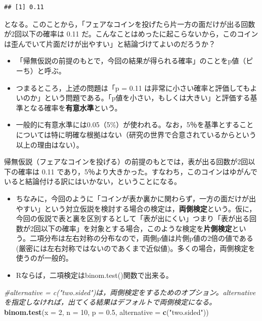 \documentclass[]{article}
\newenvironment{Shaded}{\begin{snugshade}}{\end{snugshade}}
\newcommand{\KeywordTok}[1]{\textcolor[rgb]{0.13,0.29,0.53}{\textbf{#1}}}
\newcommand{\DataTypeTok}[1]{\textcolor[rgb]{0.13,0.29,0.53}{#1}}
\newcommand{\DecValTok}[1]{\textcolor[rgb]{0.00,0.00,0.81}{#1}}
\newcommand{\FloatTok}[1]{\textcolor[rgb]{0.00,0.00,0.81}{#1}}
\newcommand{\StringTok}[1]{\textcolor[rgb]{0.31,0.60,0.02}{#1}}
\newcommand{\CommentTok}[1]{\textcolor[rgb]{0.56,0.35,0.01}{\textit{#1}}}
\newcommand{\NormalTok}[1]{#1}
\providecommand{\tightlist}{%
  \setlength{\itemsep}{0pt}\setlength{\parskip}{0pt}}
\begin{document}
\begin{verbatim}
## [1] 0.11
\end{verbatim}

となる。このことから，「フェアなコインを投げたら片一方の面だけが出る回数が2回以下の確率は
0.11
だ。こんなことはめったに起こらないから，このコインは歪んでいて片面だけが出やすい」と結論づけてよいのだろうか？

\begin{itemize}
\tightlist
\item
  「帰無仮説の前提のもとで，今回の結果が得られる確率」のことをp値（ピーち）と呼ぶ。
\item
  つまるところ，上述の問題は「p = 0.11
  は非常に小さい確率と評価してもよいのか」という問題である。「p値を小さい，もしくは大きい」と評価する基準となる確率を\textbf{有意水準}という。
\item
  一般的に有意水準には0.05（5\%）が使われる。なお，5％を基準とすることについては特に明確な根拠はない（研究の世界で合意されているからという以上の理由はない）。
\end{itemize}

帰無仮説（フェアなコインを投げる）の前提のもとでは，表が出る回数が2回以下の確率は
0.11
であり，5％より大きかった。すなわち，このコインはゆがんでいると結論付ける訳にはいかない，ということになる。

\begin{itemize}
\item
  ちなみに，今回のように「コインが表か裏かに関わらず，一方の面だけが出やすい」という対立仮説を検討する場合の検定は，\textbf{両側検定}という。仮に，今回の仮説で表と裏を区別するとして「表が出にくい」つまり「表が出る回数が2回以下の確率」を対象とする場合，このような検定を\textbf{片側検定}という。二項分布は左右対称の分布なので，両側p値は片側p値の2倍の値である(厳密には左右対称ではないのであくまで近似値)。多くの場合，両側検定を使うのが一般的。
\item
  Rならば，二項検定はbinom.test()関数で出来る。
\end{itemize}

\begin{Shaded}
\begin{Highlighting}[]
\CommentTok{#alternative = c("two.sided")は，両側検定をするためのオプション。alternativeを指定しなければ，出てくる結果はデフォルトで両側検定になる。}
\KeywordTok{binom.test}\NormalTok{(}\DataTypeTok{x =} \DecValTok{2}\NormalTok{, }\DataTypeTok{n =} \DecValTok{10}\NormalTok{, }\DataTypeTok{p =} \FloatTok{0.5}\NormalTok{, }\DataTypeTok{alternative =} \KeywordTok{c}\NormalTok{(}\StringTok{"two.sided"}\NormalTok{))}
\end{Highlighting}
\end{Shaded}
\end{document}
